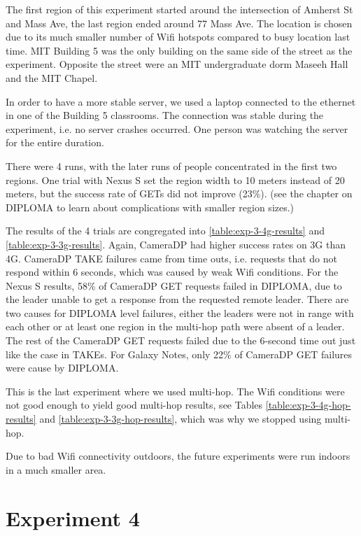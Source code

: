 The first region of this experiment started around the intersection of Amherst St and Mass Ave, the last region ended around 77 Mass Ave. The location is chosen due to its much smaller number of Wifi hotspots compared to busy location last time. MIT Building 5 was the only building on the same side of the street as the experiment. Opposite the street were an MIT undergraduate dorm Maseeh Hall and the MIT Chapel.

In order to have a more stable server, we used a laptop connected to the ethernet in one of the Building 5 classrooms. The connection was stable during the experiment, i.e. no server crashes occurred. One person was watching the server for the entire duration. 

There were 4 runs, with the later runs of people concentrated in the first two regions. One trial with Nexus S set the region width to 10 meters instead of 20 meters, but the success rate of GETs did not improve (23\%). (see the chapter on DIPLOMA to learn about complications with smaller region sizes.)

The results of the 4 trials are congregated into \ref{table:exp-3-4g-results} and \ref{table:exp-3-3g-results}. Again, CameraDP had higher success rates on 3G than 4G.  CameraDP TAKE failures came from time outs, i.e. requests that do not respond within 6 seconds, which was caused by weak Wifi conditions. For the Nexus S results, 58\% of CameraDP GET requests failed in DIPLOMA, due to the leader unable to get a response from the requested remote leader. There are two causes for DIPLOMA level failures, either the leaders were not in range with each other or at least one region in the multi-hop path were absent of a leader. The rest of the CameraDP GET requests failed due to the 6-second time out just like the case in TAKEs. For Galaxy Notes, only 22\% of CameraDP GET failures were cause by DIPLOMA.

This is the last experiment where we used multi-hop. The Wifi conditions were not good enough to yield good multi-hop results, see Tables \ref{table:exp-3-4g-hop-results} and \ref{table:exp-3-3g-hop-results}, which was why we stopped using multi-hop.

Due to bad Wifi connectivity outdoors, the future experiments were run indoors in a much smaller area.

\section{Experiment 4}

